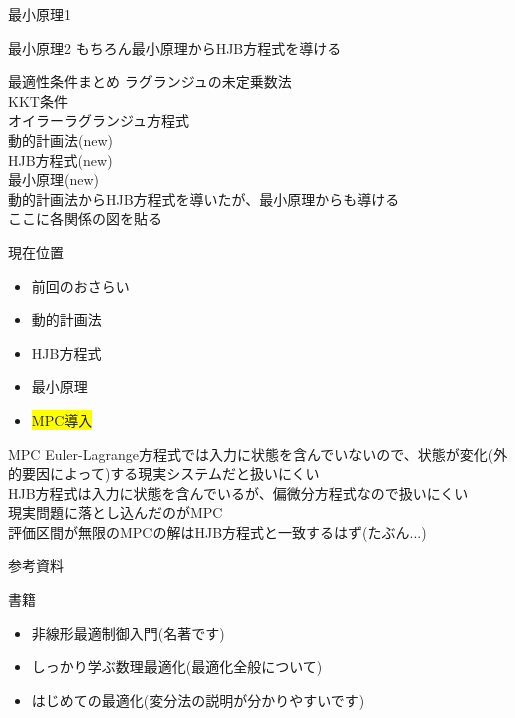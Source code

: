 \documentclass[dvipdfmx,12pt]{beamer}
\begin{document}
    \begin{frame}{最小原理1}
        \footnotesize

    \end{frame}

    \begin{frame}{最小原理2}
        \footnotesize
        もちろん最小原理からHJB方程式を導ける

    \end{frame}

    \begin{frame}{最適性条件まとめ}
        \footnotesize
        ラグランジュの未定乗数法\\
        KKT条件\\
        オイラーラグランジュ方程式\\
        動的計画法(new)\\
        HJB方程式(new)\\
        最小原理(new)\\
        動的計画法からHJB方程式を導いたが、最小原理からも導ける\\

        ここに各関係の図を貼る
    \end{frame}
    \begin{frame}{現在位置}
        \footnotesize
        \begin{itemize}
            \item 前回のおさらい
            \item 動的計画法
            \item HJB方程式
            \item 最小原理
            \item \colorbox{yellow}{MPC導入}
        \end{itemize}
    \end{frame}

    \begin{frame}{MPC}
        Euler-Lagrange方程式では入力に状態を含んでいないので、状態が変化(外的要因によって)する現実システムだと扱いにくい \\
        HJB方程式は入力に状態を含んでいるが、偏微分方程式なので扱いにくい \\
        現実問題に落とし込んだのがMPC \\
        評価区間が無限のMPCの解はHJB方程式と一致するはず(たぶん...) \\
    \end{frame}

    \begin{frame}{参考資料}
        \footnotesize

        書籍\\
        \begin{itemize}
            \item 非線形最適制御入門(名著です)
            \item しっかり学ぶ数理最適化(最適化全般について)
            \item はじめての最適化(変分法の説明が分かりやすいです)
        \end{itemize}
    \end{frame}
    
\end{document}
